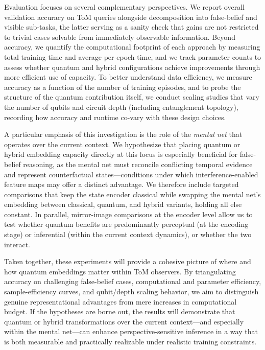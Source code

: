 Evaluation focuses on several complementary perspectives. We report overall validation accuracy on ToM queries alongside decomposition into false-belief and visible sub-tasks, the latter serving as a sanity check that gains are not restricted to trivial cases solvable from immediately observable information. Beyond accuracy, we quantify the computational footprint of each approach by measuring total training time and average per-epoch time, and we track parameter counts to assess whether quantum and hybrid configurations achieve improvements through more efficient use of capacity. To better understand data efficiency, we measure accuracy as a function of the number of training episodes, and to probe the structure of the quantum contribution itself, we conduct scaling studies that vary the number of qubits and circuit depth (including entanglement topology), recording how accuracy and runtime co-vary with these design choices.

A particular emphasis of this investigation is the role of the \emph{mental net} that operates over the current context. We hypothesize that placing quantum or hybrid embedding capacity directly at this locus is especially beneficial for false-belief reasoning, as the mental net must reconcile conflicting temporal evidence and represent counterfactual states—conditions under which interference-enabled feature maps may offer a distinct advantage. We therefore include targeted comparisons that keep the state encoder classical while swapping the mental net’s embedding between classical, quantum, and hybrid variants, holding all else constant. In parallel, mirror-image comparisons at the encoder level allow us to test whether quantum benefits are predominantly perceptual (at the encoding stage) or inferential (within the current context dynamics), or whether the two interact.

Taken together, these experiments will provide a cohesive picture of where and how quantum embeddings matter within ToM observers. By triangulating accuracy on challenging false-belief cases, computational and parameter efficiency, sample-efficiency curves, and qubit/depth scaling behavior, we aim to distinguish genuine representational advantages from mere increases in computational budget. If the hypotheses are borne out, the results will demonstrate that quantum or hybrid transformations over the current context—and especially within the mental net—can enhance perspective-sensitive inference in a way that is both measurable and practically realizable under realistic training constraints.
